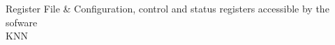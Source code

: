 Register File & Configuration, control and status registers accessible by the sofware \vspace{2mm} \\ \hline
{}
KNN \vspace{2mm} \\ \hline
